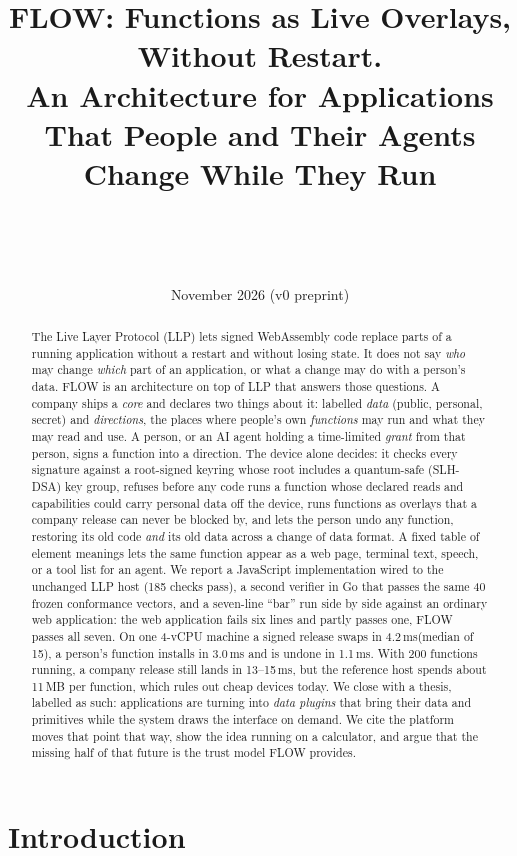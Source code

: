 \documentclass[10pt,twocolumn]{article}
\title{\textbf{FLOW: Functions as Live Overlays, Without Restart.\\[2pt]
\large An Architecture for Applications That People and Their Agents Change While They Run}}
\author{\paperauthor\\{\small \paperaffil}\\{\small\paperemail \quad \paperorcid}\\{\small\repo \quad \paperdoi}}
\date{November 2026 \quad (v0 preprint)}
\newcommand{\ms}{\,ms\xspace}
\begin{document}
\maketitle

\begin{abstract}
The Live Layer Protocol (LLP) lets signed WebAssembly code replace parts of a running application
without a restart and without losing state. It does not say \emph{who} may change \emph{which}
part of an application, or what a change may do with a person's data. FLOW is an architecture on
top of LLP that answers those questions. A company ships a \emph{core} and declares two things
about it: labelled \emph{data} (public, personal, secret) and \emph{directions}, the places where
people's own \emph{functions} may run and what they may read and use. A person, or an AI agent
holding a time-limited \emph{grant} from that person, signs a function into a direction. The device
alone decides: it checks every signature against a root-signed keyring whose root includes a
quantum-safe (SLH-DSA) key group, refuses before any code runs a function whose declared reads and
capabilities could carry personal data off the device, runs functions as overlays that a company
release can never be blocked by, and lets the person undo any function, restoring its old code
\emph{and} its old data across a change of data format. A fixed table of element meanings lets the
same function appear as a web page, terminal text, speech, or a tool list for an agent. We report a
JavaScript implementation wired to the unchanged LLP host (185 checks pass), a second verifier in Go
that passes the same 40 frozen conformance vectors, and a seven-line ``bar'' run side by side
against an ordinary web application: the web application fails six lines and partly passes one,
FLOW passes all seven. On one 4-vCPU machine a signed release swaps in 4.2\ms (median of 15), a
person's function installs in 3.0\ms and is undone in 1.1\ms. With 200 functions running, a company
release still lands in 13--15\ms, but the reference host spends about 11\,MB per function, which
rules out cheap devices today. We close with a thesis, labelled as such: applications are turning
into \emph{data plugins} that bring their data and primitives while the system draws the interface
on demand. We cite the platform moves that point that way, show the idea running on a calculator,
and argue that the missing half of that future is the trust model FLOW provides.
\end{abstract}

\section{Introduction}
\end{document}
